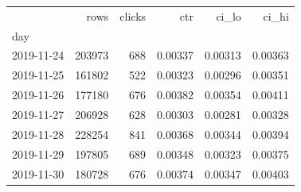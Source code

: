 \begin{tabular}{lrrrrr}
\toprule
 & rows & clicks & ctr & ci\_lo & ci\_hi \\
day &  &  &  &  &  \\
\midrule
2019-11-24 & 203973 & 688 & 0.00337 & 0.00313 & 0.00363 \\
2019-11-25 & 161802 & 522 & 0.00323 & 0.00296 & 0.00351 \\
2019-11-26 & 177180 & 676 & 0.00382 & 0.00354 & 0.00411 \\
2019-11-27 & 206928 & 628 & 0.00303 & 0.00281 & 0.00328 \\
2019-11-28 & 228254 & 841 & 0.00368 & 0.00344 & 0.00394 \\
2019-11-29 & 197805 & 689 & 0.00348 & 0.00323 & 0.00375 \\
2019-11-30 & 180728 & 676 & 0.00374 & 0.00347 & 0.00403 \\
\bottomrule
\end{tabular}
